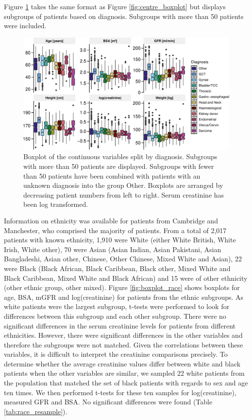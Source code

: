 \documentclass[11pt,]{article}
\begin{document}
Figure \ref{fig:boxplot_diagnosis} takes the same format as Figure
\ref{fig:centre_boxplot} but displays subgroups of patients based on
diagnosis. Subgroups with more than 50 patients were included.

\begin{figure}
\centering
\includegraphics{1_Validation_nonIDMS_resubmission_files/figure-latex/data_characteristics_plots_2-1.pdf}
\caption{\label{fig:boxplot_diagnosis}Boxplot of the continuous
variables split by diagnosis. Subgroups with more than 50 patients are
displayed. Subgroups with fewer than 50 patients have been combined with
patients with an unknown diagnosis into the group Other. Boxplots are
arranged by decreasing patient numbers from left to right. Serum
creatinine has been log transformed.}
\end{figure}

Information on ethnicity was available for patients from Cambridge and
Manchester, who comprised the majority of patients. From a total of
2,017 patients with known ethnicity, 1,910 were White (either White
British, White Irish, White other), 70 were Asian (Asian Indian, Asian
Pakistani, Asian Bangladeshi, Asian other, Chinese, Other Chinese, Mixed
White and Asian), 22 were Black (Black African, Black Caribbean, Black
other, Mixed White and Black Caribbean, Mixed White and Black African)
and 15 were of other ethnicity (other ethnic group, other mixed). Figure
\ref{fig:boxplot_race} shows boxplots for age, BSA, mGFR and
log(creatinine) for patients from the ethnic subgroups. As white
patients were the largest subgroup, t-tests were performed to look for
differences between this subgroup and each other subgroup. There were no
significant differences in the serum creatinine levels for patients from
different ethnicities. However, there were significant differences in
the other variables and therefore the subgroups were not matched. Given
the correlations between these variables, it is difficult to interpret
the creatinine comparisons precisely. To determine whether the average
creatinine values differ between white and black patients when the other
variables are similar, we sampled 22 white patients from the population
that matched the set of black patients with regards to sex and age ten
times. We then performed t-tests for these ten samples for
log(creatinine), measured GFR and BSA. No significant differences were
found (Table \ref{tab:race_resample}).
\end{document}
